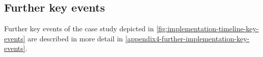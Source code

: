 \subsection{Further key events}
\label{chapter4-further-key-events}

Further key events of the case study depicted in \autoref{fig:implementation-timeline-key-events} are described in more detail in \autoref{appendix4-further-implementation-key-events}.

